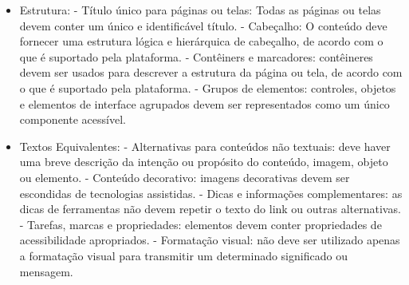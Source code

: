 \documentclass[
	12pt,				%
	oneside,			%
	a4paper,			%
	english,			%
	brazil				%
	]{abntex2ppgsi}
\begin{document}
\begin{itemize}
	\item Estrutura:
		\subitem - Título único	para páginas ou telas: Todas as páginas ou telas devem conter um único e identificável título.
		\subitem - Cabeçalho: O conteúdo deve fornecer uma estrutura lógica e hierárquica de cabeçalho, de acordo com o que é suportado pela plataforma.
		\subitem - Contêiners e marcadores: contêineres devem ser usados para descrever a estrutura da página ou tela, de acordo com o que é suportado pela plataforma.
		\subitem - Grupos de elementos: controles, objetos e elementos de interface agrupados devem ser representados como um único componente acessível.
	\item Textos Equivalentes:
		\subitem - Alternativas para conteúdos não textuais: deve haver uma breve descrição da intenção ou propósito do conteúdo, imagem, objeto ou elemento.
		\subitem - Conteúdo decorativo: imagens decorativas devem ser escondidas de tecnologias assistidas.
		\subitem - Dicas e informações complementares: as dicas de ferramentas não devem repetir o texto do link ou outras alternativas.
		\subitem - Tarefas, marcas e propriedades: elementos devem conter propriedades de acessibilidade apropriados.
		\subitem - Formatação visual: não deve ser utilizado apenas a formatação visual para transmitir um determinado significado ou mensagem.
\end{itemize}
\end{document}
